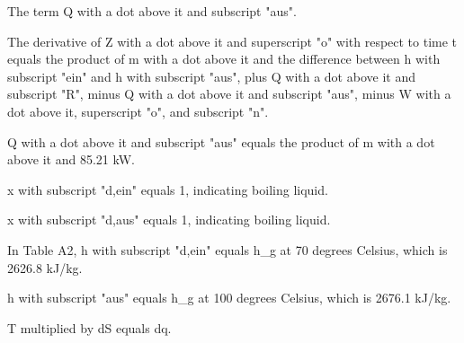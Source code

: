 The term Q with a dot above it and subscript "aus".

The derivative of Z with a dot above it and superscript "o" with respect to time t equals the product of m with a dot above it and the difference between h with subscript "ein" and h with subscript "aus", plus Q with a dot above it and subscript "R", minus Q with a dot above it and subscript "aus", minus W with a dot above it, superscript "o", and subscript "n".

Q with a dot above it and subscript "aus" equals the product of m with a dot above it and 85.21 kW.

x with subscript "d,ein" equals 1, indicating boiling liquid.

x with subscript "d,aus" equals 1, indicating boiling liquid.

In Table A2, h with subscript "d,ein" equals h_g at 70 degrees Celsius, which is 2626.8 kJ/kg.

h with subscript "aus" equals h_g at 100 degrees Celsius, which is 2676.1 kJ/kg.

T multiplied by dS equals dq.